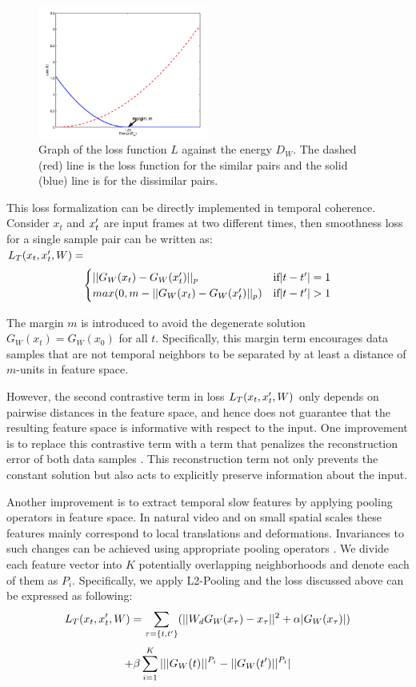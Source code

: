 \begin{figure}
\centering
\includegraphics[width=0.5\textwidth]{images/twoloss.png}
\caption{Graph of the loss function $L$ against the energy $D_W$. The dashed (red) line is the loss function for the similar pairs and the solid (blue) line is for the dissimilar pairs.}
\label{fig:twoloss}
\end{figure}

This loss formalization can be directly implemented in temporal coherence. Consider $x_t$ and $x_t\rq{}$ are input frames at two different times, then smoothness loss for a single sample pair can be written as:\\
$L_T(x_t, x_t\rq{}, W) = $
\[   
     \begin{cases}
       ||G_W(x_t) - G_W(x_t\rq{})||_p & \text{if} |t-t\rq{}| = 1\\
       max(0, m - ||G_W(x_t) - G_W(x_t\rq{})||_p) &\text{if} |t-t\rq{}| > 1 \\
     \end{cases}
\]

The margin $m$ is introduced to avoid the degenerate solution $G_W(x_t) = G_W(x_0)$ for all $t$. 
Specifically, this margin term encourages data samples that are not temporal neighbors to be separated by at least a distance of $m$-units in feature space. 

However, the second contrastive term in loss $L_T(x_t, x_t\rq{}, W)$ only depends on pairwise distances in the feature space, and hence does not guarantee that the resulting feature space is informative with respect to the input. 
One improvement is to replace this contrastive term with a term that penalizes the reconstruction error of both data samples \cite{LeCun2014coherence}. 
This reconstruction term not only prevents the constant solution but also acts to explicitly preserve information about the input.

Another improvement is to extract temporal slow features by applying pooling operators in feature space. 
In natural video and on small spatial scales these features mainly correspond to local translations and deformations. 
Invariances to such changes can be achieved using appropriate pooling operators \cite{Mallat2013scattering}.
We divide each feature vector into $K$ potentially overlapping neighborhoods and denote each of them as $P_i$. 
Specifically, we apply L2-Pooling and the loss discussed above can be expressed as following:
$$L_T(x_t, x_t\rq{}, W) = \sum_{\tau = \{t, t\rq{}\}} (||W_d G_W(x_\tau) - x_\tau||^2 + \alpha |G_W(x_\tau)|)$$
$$+ \beta \sum_{i=1}^K |||G_W(t)||^{P_i} -  ||G_W(t\rq{})||^{P_i}|$$